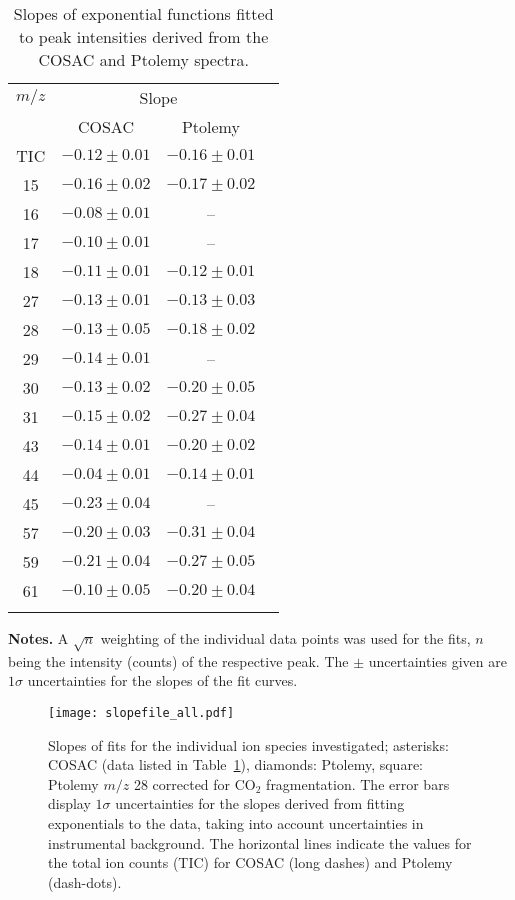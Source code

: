 \documentclass{aa}
\begin{document}
\begin{table}
   \centering
      \caption{Slopes of exponential functions fitted to peak intensities derived from the COSAC and Ptolemy spectra. }
   \begin{tabular}{@{} cccc @{}} 
   \hline      
   \hline
$m/z$ &       \multicolumn{2}{c}{Slope} \\ 
      &    COSAC            & Ptolemy \\
\hline
TIC   &   $-0.12 \pm 0.01$  & $-0.16 \pm 0.01$ \\
15    &   $-0.16 \pm 0.02$ & $-0.17 \pm 0.02$ \\
16    &   $-0.08 \pm 0.01$ &      --      \\
17    &   $-0.10 \pm 0.01$ &      --      \\
18    &   $-0.11 \pm 0.01$ & $-0.12 \pm 0.01$ \\
27    &   $-0.13 \pm 0.01$ & $-0.13 \pm 0.03$ \\
28    &  $-0.13  \pm 0.05$ & $-0.18 \pm 0.02$ \\
 29   &  $-0.14  \pm 0.01$ &       -- \\
 30   &  $-0.13  \pm 0.02$ & $-0.20 \pm 0.05$ \\
 31   &  $-0.15  \pm 0.02$ & $-0.27 \pm 0.04$ \\
 43   &  $-0.14  \pm 0.01$ & $-0.20 \pm 0.02$ \\
 44   &  $-0.04  \pm 0.01$ & $-0.14 \pm 0.01$ \\
 45   &  $-0.23  \pm 0.04$ &       --    \\
 57   &  $-0.20  \pm 0.03$ & $-0.31 \pm 0.04$ \\  
  59   &  $-0.21  \pm 0.04$ & $-0.27 \pm 0.05$ \\ 
  61   &  $-0.10 \pm  0.05$ & $-0.20 \pm 0.04$ \\
      \hline
      &    & \\
         \end{tabular}
         
         {\bf Notes.} A 
      $\sqrt{n}$ weighting of the individual data points was used for the fits, $n$ being the intensity (counts) of the respective peak. The $\pm$ uncertainties given are  
$1 \sigma$ uncertainties for the slopes of the fit curves.
   \label{tab_2}
\end{table}


\begin{figure*}
   \centering
   \vspace{-0.3cm}
\texttt{[image: slopefile\_all.pdf]}
\vspace{-8.1cm}
\caption[]{
Slopes of fits for the individual ion species investigated; asterisks: COSAC (data listed in Table~\ref{tab_2}), diamonds: Ptolemy, square: Ptolemy $m/z$ 28 corrected for $\mathrm{CO_2}$ fragmentation. The error bars display $1\sigma$ uncertainties for the slopes derived from fitting exponentials to the data, taking into account uncertainties in instrumental background. The horizontal lines indicate
the values for the total ion counts (TIC) for COSAC (long dashes) and Ptolemy (dash-dots). 
}
\label{fig_3}
\end{figure*}
\end{document}
